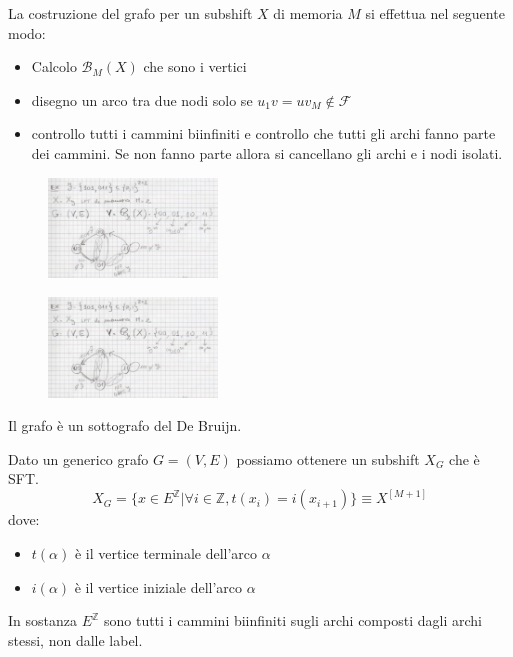 La costruzione del grafo per un subshift $X$ di memoria $M$ si effettua nel seguente modo:
\begin{itemize}
    \item Calcolo $\mathcal{B}_M(X)$ che sono i vertici
    \item disegno un arco tra due nodi solo se $u_1v=uv_M \not \in \mathcal{F}$
    \item controllo tutti i cammini biinfiniti e controllo che tutti gli archi
          fanno parte dei cammini. Se non fanno parte allora si cancellano gli archi e i
          nodi isolati.
\end{itemize}
\begin{figure}[!h]
    \centering
    \includegraphics[width=0.4\textwidth]{img/sistemi_complessi/subshift.png}
\end{figure}

\begin{figure}[!h]
    \centering
    \includegraphics[width=0.4\textwidth]{img/sistemi_complessi/subshift.png}
\end{figure}



Il grafo è un sottografo del De Bruijn.

Dato un generico grafo $G=(V,E)$ possiamo ottenere un subshift $X_G$ che è SFT.
$$X_G=\{x\in E^\mathbb{Z}|\forall i\in\mathbb{Z}, t(x_i) = i(x_{i+1}) \}\equiv X^{[M+1]}$$
dove:
\begin{itemize}
    \item $t(\alpha)$ è il vertice terminale dell'arco $\alpha$
    \item $i(\alpha)$ è il vertice iniziale dell'arco $\alpha$
\end{itemize}

In sostanza $E^\mathbb{Z}$ sono tutti i cammini biinfiniti sugli archi composti dagli archi
stessi, non dalle label.

